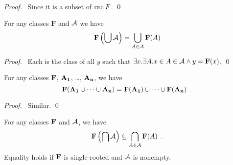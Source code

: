 \begin{proof}
    \pf\ Since it is a subset of $\ran F$. \qed
\end{proof}

\begin{theorem}[Pairing]
    For any classes $\mathbf{F}$ and $\mathbf{\AA}$ we have
    \[ \mathbf{F} \left( \bigcup \mathbf{\AA} \right) = \bigcup_{A \in \mathbf{\AA}} \mathbf{F}(A) \]
\end{theorem}

\begin{proof}
    \pf\ Each is the class of all $y$ such that $\exists x. \exists A.
    x \in A \in \mathbf{\AA} \wedge y = \mathbf{F}(x)$. \qed
\end{proof}

\begin{theorem}[Pairing]
    For any classes $\mb{F}$, $\mb{A_1}$, \ldots, $\mb{A_n}$, we have
    \[ \mb{F}(\mb{A_1} \cup \cdots \cup \mb{A_n}) = \mb{F}(\mb{A_1}) \cup \cdots \cup \mb{F}(\mb{A_n}) \enspace . \]
\end{theorem}

\begin{proof}
    \pf\ Similar. \qed
\end{proof}

\begin{theorem}[Pairing]
    For any classes $\mb{F}$ and $\mb{\AA}$, we have
    \[ \mb{F} \left( \bigcap \mb{\AA} \right) \subseteq \bigcap_{A \in \mb{\AA}} \mb{F}(A) \enspace . \]
    Equality holds if $\mb{F}$ is single-rooted and $\mb{\AA}$ is nonempty.
\end{theorem}


